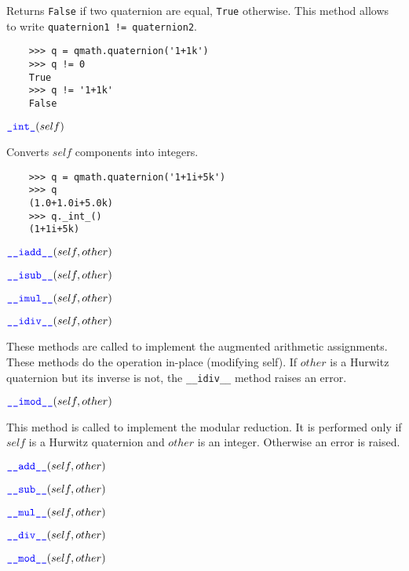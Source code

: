 \documentclass[11pt]{paper}
\begin{document}
Returns \texttt{False} if two quaternion are equal, \texttt{True} otherwise. This method allows to write \texttt{quaternion1 != quaternion2}.

\begin{verbatim}
    >>> q = qmath.quaternion('1+1k')
    >>> q != 0
    True
    >>> q != '1+1k'
    False
\end{verbatim}

\medskip

\noindent $\textcolor{blue}{\texttt{\_\mbox{int}\_}}(self)$

Converts $self$ components into integers.
\begin{verbatim}
    >>> q = qmath.quaternion('1+1i+5k')
    >>> q
    (1.0+1.0i+5.0k)    
    >>> q._int_()
    (1+1i+5k)
\end{verbatim}

\medskip

\noindent $\textcolor{blue}{\texttt{\_\_\mbox{iadd}\_\_}}(self,other)$

\noindent $\textcolor{blue}{\texttt{\_\_\mbox{isub}\_\_}}(self,other)$

\noindent $\textcolor{blue}{\texttt{\_\_\mbox{imul}\_\_}}(self,other)$ 

\noindent $\textcolor{blue}{\texttt{\_\_\mbox{idiv}\_\_}}(self,other)$

These methods are called to implement the augmented arithmetic assignments. These methods do the operation in-place (modifying self). If $other$ is a Hurwitz quaternion but its inverse is not, the \texttt{\_\_\mbox{idiv}\_\_} method raises an error.

\medskip

\noindent $\textcolor{blue}{\texttt{\_\_\mbox{imod}\_\_}}(self,other)$

This method is called to implement the modular reduction. It is performed only if $self$ is a Hurwitz quaternion and $other$ is an integer. Otherwise an error is raised.  

\medskip

\noindent $\textcolor{blue}{\texttt{\_\_\mbox{add}\_\_}}(self,other)$

\noindent $\textcolor{blue}{\texttt{\_\_\mbox{sub}\_\_}}(self,other)$

\noindent $\textcolor{blue}{\texttt{\_\_\mbox{mul}\_\_}}(self,other)$

\noindent $\textcolor{blue}{\texttt{\_\_\mbox{div}\_\_}}(self,other)$

\noindent $\textcolor{blue}{\texttt{\_\_\mbox{mod}\_\_}}(self,other)$
\end{document}
